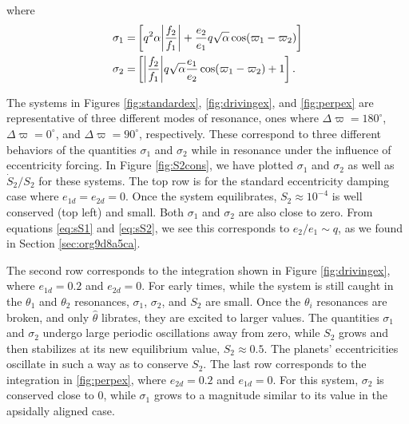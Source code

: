 \documentclass[usenatbib,twocolumn]{mnras}
\DeclarePairedDelimiter{\abs}{|}{|}
\begin{document}
\noindent
where
\begin{align}
  \label{eq:sS1}
  \sigma_1=&\left[
                  q^2\alpha\abs*{\frac{f_2}{f_1}}
                  + \frac{e_2}{e_1}q\sqrt{\alpha}\cos(\varpi_1-\varpi_2)
                  \right]\\
  \label{eq:sS2}
  \sigma_2=&\left[
                  \abs*{\frac{f_2}{f_1}} q\sqrt{\alpha}
                  \frac{e_1}{e_2}\cos(\varpi_1-\varpi_2) + 1
                  \right].
\end{align}

The systems in Figures \ref{fig:standardex}, \ref{fig:drivingex}, and
\ref{fig:perpex} are representative of three different modes of
resonance, ones where \(\Delta\varpi=180^\circ\),
\(\Delta\varpi=0^\circ\), and \(\Delta\varpi=90^\circ\),
respectively. These correspond to three different behaviors of the
quantities \(\sigma_1\) and \(\sigma_2\) while in resonance
under the influence of eccentricity forcing.
In Figure \ref{fig:S2cons}, we have plotted \(\sigma_1\) and
\(\sigma_2\) as well as \(\dot S_2/S_2\) for these systems.  The top
row is for the standard eccentricity damping case where
\(e_{1d}=e_{2d}=0\).  Once the system equilibrates, \(S_2\approx 10^{-4}\)
is well conserved (top left) and small. Both \(\sigma_1\) and
\(\sigma_2\) are also close to zero. From equations \eqref{eq:sS1}
and \eqref{eq:sS2}, we see this corresponds to \(e_2/e_1 \sim q\), as we
found in Section \ref{sec:org9d8a5ca}.

The second row corresponds to the integration shown in Figure
\ref{fig:drivingex}, where \(e_{1d}=0.2\) and \(e_{2d}=0\).  For early
times, while the system is still caught in the \(\theta_1\) and
\(\theta_2\) resonances, \(\sigma_1\), \(\sigma_2\), and \(S_2\) are
small.  Once the \(\theta_i\) resonances are broken, and only
\(\hat\theta\) librates, they are excited to larger values.  The
quantities \(\sigma_1\) and \(\sigma_2\) undergo large periodic
oscillations away from zero, while \(S_2\) grows and then stabilizes at
its new equilibrium value, \(S_2\approx 0.5\). The planets'
eccentricities oscillate in such a way as to conserve \(S_2\).  The last
row corresponds to the integration in \ref{fig:perpex}, where
\(e_{2d}=0.2\) and \(e_{1d}=0\).  For this system, \(\sigma_2\) is
conserved close to 0, while \(\sigma_1\) grows to a magnitude
similar to its value in the apsidally aligned case.
\end{document}
